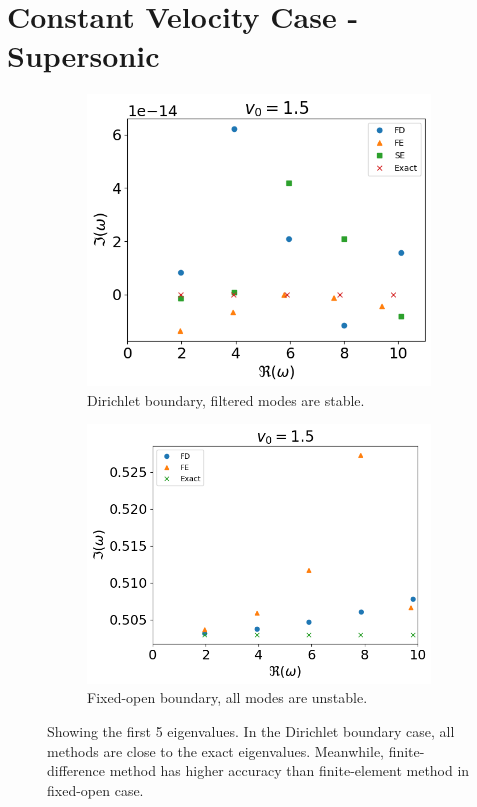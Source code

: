 \section{Constant Velocity Case - Supersonic}
\begin{figure}[H]
  \begin{subfigure}{0.45\textwidth}
    \centering
    \includegraphics[width=0.9\linewidth]{../../thesis/img/numerical-experiments/fixed-fixed/constant-v-v0=1.5}
    \caption{Dirichlet boundary, filtered modes are stable.}
  \end{subfigure}%
  \begin{subfigure}{0.45\textwidth}
    \includegraphics[width=\linewidth]{../../thesis/img/numerical-experiments/fixed-open/constant-v-v0=1.5}
    \caption{Fixed-open boundary, all modes are unstable.}
  \end{subfigure}
  \caption{Showing the first 5 eigenvalues. In the Dirichlet boundary case, all methods are close to the exact eigenvalues. Meanwhile, finite-difference method has higher accuracy than finite-element method in fixed-open case.}
  \label{fig:constant-v-supersonic}
\end{figure}

